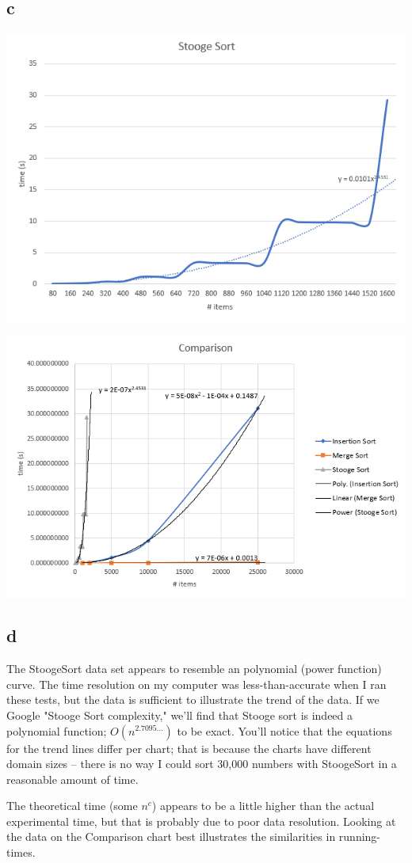 \documentclass[10pt,a4paper]{report}
\begin{document}
	\newpage
	\subsection*{c}
	\includegraphics[scale=0.6]{stooge}
	
	\includegraphics[scale=0.8]{comparison}
	
	\newpage
	\subsection*{d}
	The StoogeSort data set appears to resemble an polynomial (power function) curve. The time resolution on my computer was less-than-accurate when I ran these tests, but the data is sufficient to illustrate the trend of the data. If we Google "Stooge Sort complexity," we'll find that Stooge sort is indeed a polynomial function; $O(n^{2.7095...})$ to be exact. You'll notice that the equations for the trend lines differ per chart; that is because the charts have different domain sizes -- there is no way I could sort 30,000 numbers with StoogeSort in a reasonable amount of time.
	
	The theoretical time (some $n^c$) appears to be a little higher than the actual experimental time, but that is probably due to poor data resolution. Looking at the data on the Comparison chart best illustrates the similarities in running-times.
	
\end{document}
